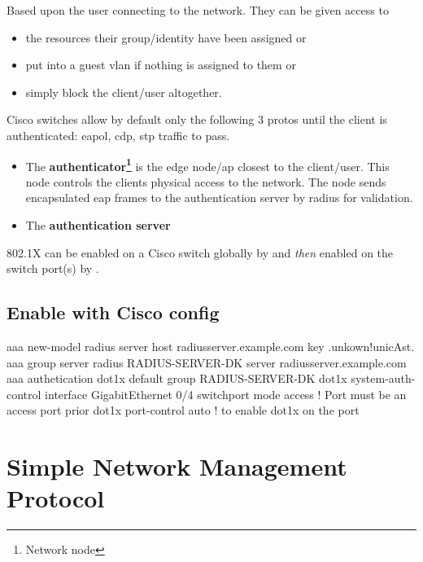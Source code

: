 
Based upon the user connecting to the network. They can be given access to
\begin{itemize}
	\item the resources their group/identity have been assigned or
	\item put into a guest \gls{vlan} if nothing is assigned to them or
	\item simply block the client/user altogether.
\end{itemize}

Cisco switches allow by default only the following 3 protos until the client is authenticated: \gls{eapol}, \gls{cdp}, \gls{stp} traffic to pass.

\begin{itemize}
	\item The \textbf{authenticator\footnote{Network node}} is the edge node/\gls{ap} closest to the client/user. This node controls the clients physical access to the network. The node sends encapsulated \gls{eap} frames to the authentication server by radius for validation.
	\item The \textbf{authentication server}
\end{itemize}


802.1X can be enabled on a Cisco switch globally by  and \textit{then} enabled on the switch port{\footnotesize (s)} by .

\subsection*{Enable with Cisco config}

\begin{txt}
	aaa new-model
	radius server host radiusserver.example.com key .unkown!unicAst.
	aaa group server radius RADIUS-SERVER-DK
	server radiusserver.example.com
	aaa authetication dot1x default group RADIUS-SERVER-DK
	dot1x system-auth-control
	interface GigabitEthernet 0/4
	switchport mode access         ! Port must be an access port prior
	dot1x port-control auto        ! to enable dot1x on the port
\end{txt}

\section[SNMP]{Simple Network Management Protocol}

